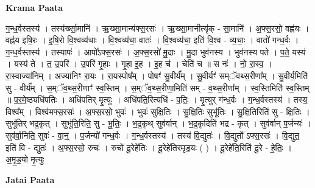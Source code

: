 \documentclass[17pt]{extarticle}
\begin{document}
\textbf{Krama Paata} \newline

ग॒न्ध॒र्वस्तस्य॑ । तस्य॑र्ख्सा॒मानि॑ । ऋ॒ख्सा॒मान्य॑फ्स॒रसः॑ । ऋ॒ख्सा॒मानीत्यृ॑क् - सा॒मानि॑ । अ॒फ्स॒रसो॒ वह्न॑यः । वह्न॑य इषि॒रः । इ॒षि॒रो वि॒श्वव्य॑चाः । वि॒श्वव्य॑चा॒ वातः॑ । वि॒श्वव्य॑चा॒ इति॑ वि॒श्व - व्य॒चाः॒ । वातो॑ गन्ध॒र्वः । ग॒न्ध॒र्वस्तस्य॑ । तस्यापः॑ । आपो᳚ऽफ्स॒रसः॑ । अ॒फ्स॒रसो॑ मु॒दाः । मु॒दा भुव॑नस्य । भुव॑नस्य पते । प॒ते॒ यस्य॑ । यस्य॑ ते । त॒ उ॒परि॑ । उ॒परि॑ गृ॒हाः । गृ॒हा इ॒ह । इ॒ह च॑ । चेति॑ च ॥ स नः॑ । नो॒ रा॒स्व॒ । रा॒स्वाज्या॑निम् । अज्या॑निꣳ रा॒यः । रा॒यस्पोष᳚म् । पोषꣳ॑ सु॒वीर्य᳚म् । सु॒वीर्यꣳ॑ सम्ॅवथ्स॒रीणा᳚म् । सु॒वीर्य॒मिति॑ सु - वीर्य᳚म् । स॒म्ॅव॒थ्स॒रीणाꣳ॑ स्व॒स्तिम् । स॒म्ॅव॒थ्स॒रीणा॒मिति॑ सम् - व॒थ्स॒रीणा᳚म् । स्व॒स्तिमिति॑ स्व॒स्तिम् ॥ प॒र॒मे॒ष्ठ्यधि॑पतिः । अधि॑पतिर् मृ॒त्युः । अधि॑पति॒रित्यधि॑ - प॒तिः॒ । मृ॒त्युर् ग॑न्ध॒र्वः । ग॒न्ध॒र्वस्तस्य॑ । तस्य॒ विश्व᳚म् । विश्व॑मफ्स॒रसः॑ । अ॒फ्स॒रसो॒ भुवः॑ । भुवः॑ सुक्षि॒तिः । सु॒क्षि॒तिः सुभू॑तिः । सु॒क्षि॒तिरिति॑ सु - क्षि॒तिः । सुभू॑तिर् भद्र॒कृत् । सुभू॑ति॒रिति॒ सु - भू॒तिः॒ । भ॒द्र॒कृथ् सुव॑र्वान् । भ॒द्र॒कृदिति॑ भद्र - कृत् । सुव॑र्वान् प॒र्जन्यः॑ । सुव॑र्वा॒निति॒ सुवः॑ - वा॒न्॒ । प॒र्जन्यो॑ गन्ध॒र्वः । ग॒न्ध॒र्वस्तस्य॑ । तस्य॑ वि॒द्युतः॑ । वि॒द्युतो᳚ ऽफ्स॒रसः॑ । वि॒द्युत॒ इति॑ वि - द्युतः॑ । अ॒फ्स॒रसो॒ रुचः॑ । रुचो॑ दू॒रेहे॑तिः । दू॒रेहे॑तिरमृड॒यः ( ) । दू॒रेहे॑ति॒रिति॑ दू॒रे - हे॒तिः॒ । अ॒मृ॒ड॒यो मृ॒त्युः \newline

\textbf{Jatai Paata} \newline
\end{document}
